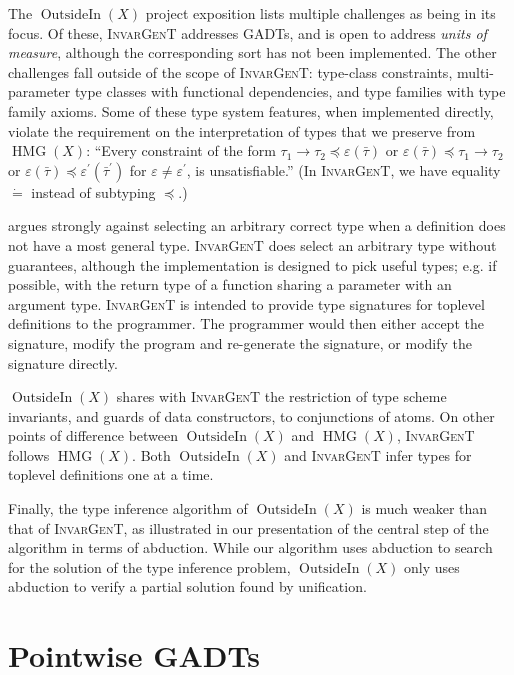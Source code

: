 \documentclass{article}
\newcommand{\tmem}[1]{{\em #1\/}}
\newcommand{\tmname}[1]{\textsc{#1}}
\newcommand{\tmop}[1]{\ensuremath{\operatorname{#1}}}
\begin{document}
The $\tmop{OutsideIn} (X)$ project exposition {\cite{OutsideIn}} lists
multiple challenges as being in its focus. Of these, {\tmname{InvarGenT}}
addresses GADTs, and is open to address {\tmem{units of measure}}, although
the corresponding sort has not been implemented. The other challenges fall
outside of the scope of {\tmname{InvarGenT}}: type-class constraints,
multi-parameter type classes with functional dependencies, and type families
with type family axioms. Some of these type system features, when implemented
directly, violate the requirement on the interpretation of types that we
preserve from $\tmop{HMG} (X)$: ``Every constraint of the form $\tau_1
\rightarrow \tau_2 \preccurlyeq \varepsilon (\bar{\tau})$ or $\varepsilon
(\bar{\tau}) \preccurlyeq \tau_1 \rightarrow \tau_2$ or $\varepsilon
(\bar{\tau}) \preccurlyeq \varepsilon^{\prime} (\bar{\tau}^{\prime})$ for
$\varepsilon \neq \varepsilon^{\prime}$, is unsatisfiable.'' (In
{\tmname{InvarGenT}}, we have equality $\dot{=}$ instead of subtyping
$\preccurlyeq$.)

{\cite{OutsideIn}} argues strongly against selecting an arbitrary correct type
when a definition does not have a most general type. {\tmname{InvarGenT}} does
select an arbitrary type without guarantees, although the implementation is
designed to pick useful types; e.g. if possible, with the return type of a
function sharing a parameter with an argument type. {\tmname{InvarGenT}} is
intended to provide type signatures for toplevel definitions to the
programmer. The programmer would then either accept the signature, modify the
program and re-generate the signature, or modify the signature directly.

$\tmop{OutsideIn} (X)$ shares with {\tmname{InvarGenT}} the restriction of
type scheme invariants, and guards of data constructors, to conjunctions of
atoms. On other points of difference between $\tmop{OutsideIn} (X)$ and
$\tmop{HMG} (X)$, {\tmname{InvarGenT}} follows $\tmop{HMG} (X)$. Both
$\tmop{OutsideIn} (X)$ and {\tmname{InvarGenT}} infer types for toplevel
definitions one at a time.

Finally, the type inference algorithm of $\tmop{OutsideIn} (X)$ is much weaker
than that of {\tmname{InvarGenT}}, as illustrated in our presentation of the
central step of the algorithm in terms of abduction. While our algorithm uses
abduction to search for the solution of the type inference problem,
$\tmop{OutsideIn} (X)$ only uses abduction to verify a partial solution found
by unification.

\section{Pointwise GADTs}\label{PointwiseSection}
\end{document}
